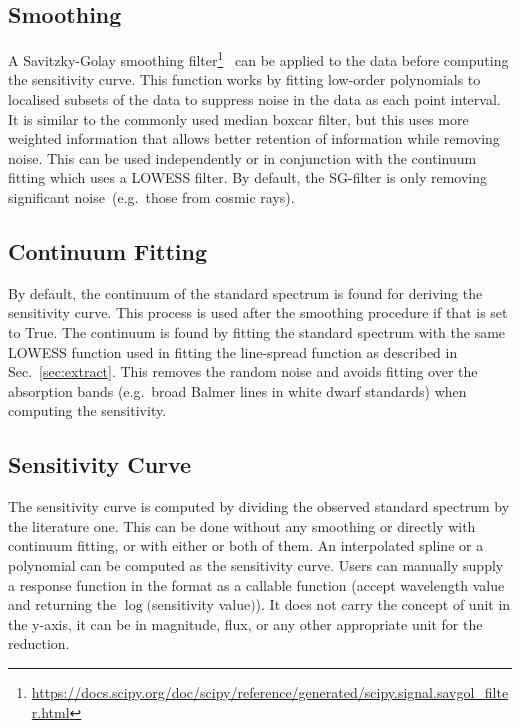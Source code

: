 \documentclass[fleqn,usenatbib]{mnras}
\begin{document}
\subsection*{Smoothing}
A Savitzky-Golay smoothing
filter\footnote{\url{https://docs.scipy.org/doc/scipy/reference/generated/scipy.signal.savgol_filter.html}}~\citep[hereafter, SG-filter]{1964AnaCh..36.1627S}
can be applied to the data before computing the sensitivity curve.
This function works by fitting low-order polynomials to localised
subsets of the data to suppress noise in the data as each point
interval. It is similar to the commonly used median boxcar filter,
but this uses more weighted information that allows better
retention of information while removing noise. This can be
used independently or in conjunction with the continuum fitting which
uses a LOWESS filter. By default, the SG-filter is only removing
significant noise~(e.g.\ those from cosmic rays).

\subsection*{Continuum Fitting}
By default, the continuum of the standard spectrum is found for
deriving the sensitivity curve. This process is used after the
smoothing procedure if that is set to True. The continuum is found
by fitting the standard spectrum with the same LOWESS function
used in fitting the line-spread function as described in
Sec.~\ref{sec:extract}. This removes the random noise and avoids
fitting over the absorption bands (e.g.\ broad Balmer lines in
white dwarf standards) when computing the sensitivity.

\subsection*{Sensitivity Curve}
The sensitivity curve is computed by dividing the observed standard
spectrum by the literature one. This can be done without any smoothing
or directly with continuum fitting, or with either or both of them.
An interpolated spline or a polynomial can be computed as the
sensitivity curve. Users can manually supply a response function in
the format as a callable function (accept wavelength value and returning the
$\log($sensitivity value$)$). It does not carry the concept of unit in the y-axis,
it can be in magnitude, flux, or any other appropriate unit for the
reduction.
\end{document}
